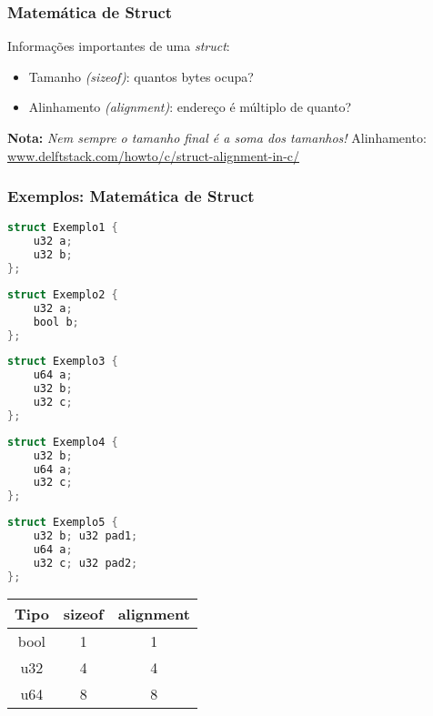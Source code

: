 \documentclass{beamer}
\newcommand{\nota}[1]{\textbf{Nota:}\textit{ #1}}
\newcommand{\tabelasizealign}{%
    \begin{tabular}{|c|c|c|}%
        \hline%
        Tipo & sizeof & alignment \\\hline%
        \hline%
        bool & 1      & 1         \\\hline%
        u32  & 4      & 4         \\\hline%
        u64  & 8      & 8         \\\hline%
    \end{tabular}%
}
\begin{document}
\begin{frame}
    \frametitle{Matemática de Struct}
    Informações importantes de uma \emph{struct}:
    \begin{itemize}
        \item Tamanho \emph{(sizeof)}:
            quantos bytes ocupa?
        \item Alinhamento \emph{(alignment)}:
            endereço é múltiplo de quanto?
    \end{itemize}
    \vfill
    \nota{Nem sempre o \emph{tamanho final}
        é a soma dos \emph{tamanhos}!}
    \vfill
    Alinhamento:
    \url{www.delftstack.com/howto/c/struct-alignment-in-c/}
\end{frame}

\begin{frame}[fragile]
    \frametitle{Exemplos: Matemática de Struct}
    \begin{multicols}{2}
        \begin{lstlisting}[language=C]
struct Exemplo1 {
    u32 a;
    u32 b;
};
        \end{lstlisting}
        \begin{lstlisting}[language=C]
struct Exemplo2 {
    u32 a;
    bool b;
};
        \end{lstlisting}
        \begin{lstlisting}[language=C]
struct Exemplo3 {
    u64 a;
    u32 b;
    u32 c;
};
        \end{lstlisting}
        \columnbreak
        \begin{lstlisting}[language=C]
struct Exemplo4 {
    u32 b;
    u64 a;
    u32 c;
};
        \end{lstlisting}
        \begin{lstlisting}[language=C]
struct Exemplo5 {
    u32 b; u32 pad1;
    u64 a;
    u32 c; u32 pad2;
};
        \end{lstlisting}
        \tabelasizealign{}
    \end{multicols}
\end{frame}
\end{document}
